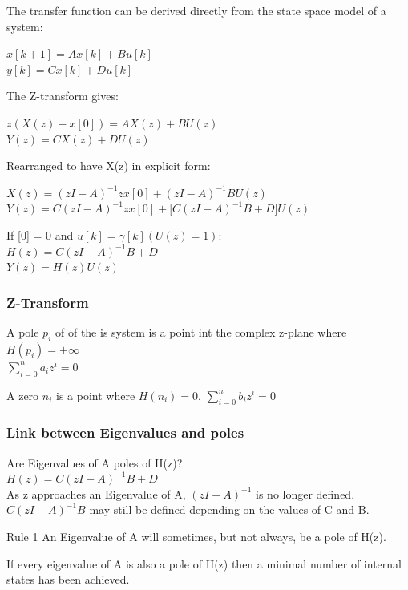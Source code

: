 \begin{frame}
	The transfer function can be derived directly from the state space model of a system:\\
	\begin{center}
		$x[k+1] = Ax[k] + Bu[k] $\\
		$y[k] = Cx[k]+Du[k]$
	\end{center}
	The Z-transform gives:
	\begin{center}
		$z(X(z)-x[0]) = AX(z)+BU(z)$\\
		$Y(z) = CX(z)+DU(z)$
	\end{center}
	Rearranged to have X(z) in explicit form:
	\begin{center}
		$X(z) = (zI-A)^{-1}zx[0] + (zI-A)^{-1}BU(z) $\\
		$Y(z) = C(zI-A)^{-1}zx[0] + \bigg[C(zI-A)^{-1}B + D\bigg]U(z)$
	\end{center}
	If [0] = 0 and $u[k] = \gamma[k] (U(z)=1)$:\\
	$H(z) = C(zI-A)^{-1}B + D$\\
	$Y(z)=H(z)U(z)$
\end{frame}
\begin{frame}
	\frametitle{Z-Transform}
	\begin{definition}
		A pole $p_i$ of of the is system is a point int the complex z-plane where $H(p_i) = \pm \infty$\\
		$\sum\limits_{i=0}^{n}a_iz^{i} = 0$
	\end{definition}
	\begin{definition}
		A zero $n_i$ is a point where $H(n_i)=0$.
		$\sum\limits_{i=0}^{n}b_iz^{i} = 0$
	\end{definition}
\end{frame}
\begin{frame}
	\frametitle{Link between Eigenvalues and poles}
	Are Eigenvalues of A poles of H(z)?\\
	$H(z) = C(zI-A)^{-1}B + D$ \\
	As z approaches an Eigenvalue of A, $(zI-A)^{-1}$ is no longer defined.\\
	$C(zI-A)^{-1}B$	may still be defined depending on the values of C and B.
	\begin{block}{Rule 1}
			An Eigenvalue of A will sometimes, but not always, be a pole of H(z).
	\end{block}
	\begin{definition}
		If every eigenvalue of A is also a pole of H(z) then a minimal number of internal states has been achieved.
	\end{definition}
	
	
\end{frame}
